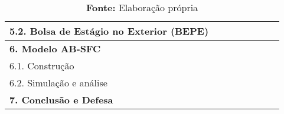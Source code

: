 \begin{table}[H]
{\begin{tabular}{ll|l|l|l|l|ll}
\textbf{5.2. Bolsa de Estágio no Exterior (BEPE)}\footnotemark &&&&&\cellcolor[HTML]{9B9B9B}& \\ \hline
\textbf{6. Modelo AB-SFC} &&&\cellcolor[HTML]{FF0000}&\cellcolor[HTML]{FF0000}&\cellcolor[HTML]{FF0000}&\cellcolor[HTML]{FF0000} \\ \hline
6.1. Construção &&&\cellcolor[HTML]{FF9933}&\cellcolor[HTML]{FF9933}&& \\ \hline
6.2. Simulação e análise &&&&&\cellcolor[HTML]{FF9933}&\cellcolor[HTML]{FF9933}\\ \hline

\textbf{7. Conclusão e Defesa} & & &  &  & & \cellcolor[HTML]{9B9B9B} \\ \hline \hline
		
	

\end{tabular}%
	\renewcommand{\arraystretch}{0.4}
	}
\caption*{\textbf{Fonte:} Elaboração própria}
\end{table}
